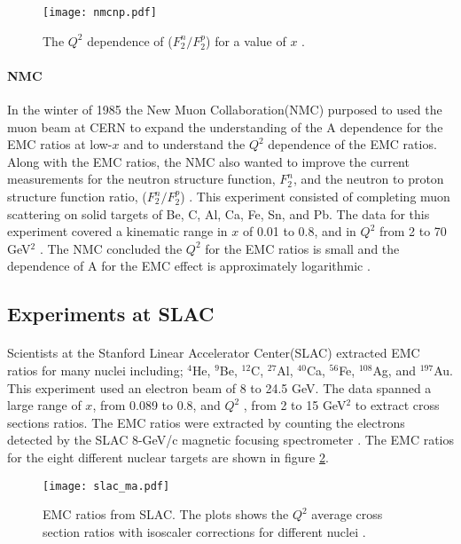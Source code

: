 \begin{figure}[H]
	\centering
	\caption{The $Q^2$ dependence of ($F_2^n/F_2^p$) for a value of $x$ \cite{ref:NMC}.}
	\label{fig:nmcnp}
	\centering
	\texttt{[image: nmcnp.pdf]}
\end{figure}
\paragraph{NMC}In the winter of 1985 the New Muon Collaboration(NMC) purposed to used the muon beam at CERN to expand the understanding of the A dependence for the EMC ratios at low-$x$ and to understand the $Q^2$ dependence of the EMC ratios. Along with the EMC ratios, the NMC also wanted to improve the current measurements for the neutron structure function, $F_2^n$, and the neutron to proton structure function ratio, ($F_2^n/F_2^p$) \cite{NMCtech}. This experiment consisted of completing muon scattering on solid targets of Be, C, Al, Ca, Fe, Sn, and Pb. The data for this experiment covered a kinematic range in $x$ of 0.01 to 0.8, and in $Q^2$ from 2 to 70 GeV$^2$ \cite{ref:NMC}. The NMC concluded the $Q^2$ for the EMC ratios is small and the dependence of A for the EMC effect is approximately logarithmic \cite{ref:NMC,Ajth}. 

\subsection{Experiments at SLAC}
\paragraph{}Scientists at the Stanford Linear Accelerator Center(SLAC) extracted EMC ratios for many nuclei including; $^4$He, $^9$Be, $^{12}$C, $^{27}$Al, $^{40}$Ca, $^{56}$Fe, $^{108}$Ag, and $^{197}$Au. This experiment used an electron beam of 8 to 24.5 GeV. The data spanned a large range of $x$, from 0.089 to 0.8, and $Q^2$ , from 2 to 15 GeV$^2$ to extract cross sections ratios. The EMC ratios were extracted by counting the electrons detected by the SLAC 8-GeV/c magnetic focusing spectrometer \cite{gomez}. The EMC ratios for the eight different nuclear targets are shown in figure \ref{gomez_ma}.
\begin{figure}[h]
	\centering
	\caption{EMC ratios from SLAC. The plots shows the $Q^2$ average cross section ratios with isoscaler corrections for different nuclei \cite{gomez}.}
	\label{gomez_ma}
	\texttt{[image: slac\_ma.pdf]} 
\end{figure} 
